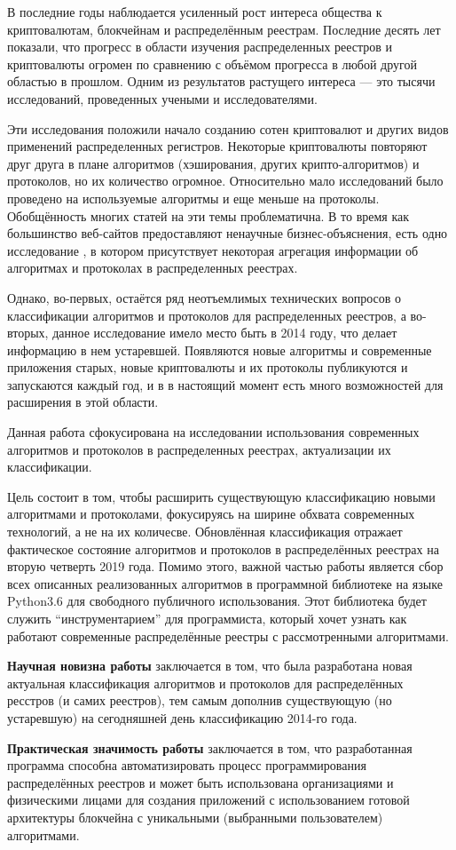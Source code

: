\tab[0.88cm]В последние годы наблюдается усиленный рост интереса общества к криптовалютам,
блокчейнам и распределённым реестрам.
Последние десять лет показали, что прогресс в области изучения распределенных
реестров и криптовалюты огромен по сравнению с объёмом прогресса в любой
другой областью в прошлом.
Одним из результатов растущего интереса --- это тысячи исследований,
проведенных учеными и исследователями.

Эти исследования положили начало
созданию сотен криптовалют и других видов применений распределенных регистров.
Некоторые криптовалюты повторяют друг друга в плане алгоритмов (хэширования,
других крипто-алгоритмов) и протоколов, но их количество огромное. Относительно
мало исследований было проведено на используемые алгоритмы и еще меньше на
протоколы. Обобщённость многих статей на эти темы проблематична. В то время как
большинство веб-сайтов предоставляют ненаучные бизнес-объяснения, есть одно
исследование \cite{TimSwanson2014}, в котором присутствует некоторая
агрегация информации об алгоритмах и протоколах в распределенных реестрах.

Однако, во-первых, остаётся ряд неотъемлимых технических вопросов о
классификации алгоритмов и протоколов для распределенных реестров, а во-вторых,
данное исследование имело место быть в 2014 году, что делает информацию в нем
устаревшей.  Появляются новые алгоритмы и современные приложения старых, новые
криптовалюты и их протоколы публикуются и запускаются каждый год, и в в
настоящий момент есть много возможностей для расширения в этой области.

Данная работа сфокусирована на исследовании использования современных
алгоритмов и протоколов в распределенных реестрах, актуализации их
классификации.

Цель состоит в том, чтобы расширить существующую классификацию
новыми алгоритмами и протоколами, фокусируясь на ширине обхвата современных
технологий, а не на их количесве. Обновлённая классификация отражает
фактическое состояние алгоритмов и протоколов в распределённых реестрах на
вторую четверть 2019 года. Помимо этого, важной частью работы является сбор
всех описанных реализованных алгоритмов в программной библиотеке на языке
Python3.6 для свободного публичного использования. Этот библиотека будет
служить ``инструментарием'' для программиста, который хочет узнать как работают
современные распределённые реестры с рассмотренными алгоритмами.

\textbf{Научная новизна работы} заключается в том, что была разработана новая
актуальная классификация алгоритмов и протоколов для распределённых ресстров (и
самих реестров), тем самым дополнив существующую (но устаревшую) на сегодняшней
день классификацию 2014-го года.

\textbf{Практическая значимость работы} заключается в том, что разработанная
программа способна автоматизировать процесс программирования распределённых
реестров и может быть использована организациями и физическими лицами для
создания приложений с использованием готовой архитектуры блокчейна с
уникальными (выбранными пользователем) алгоритмами.
